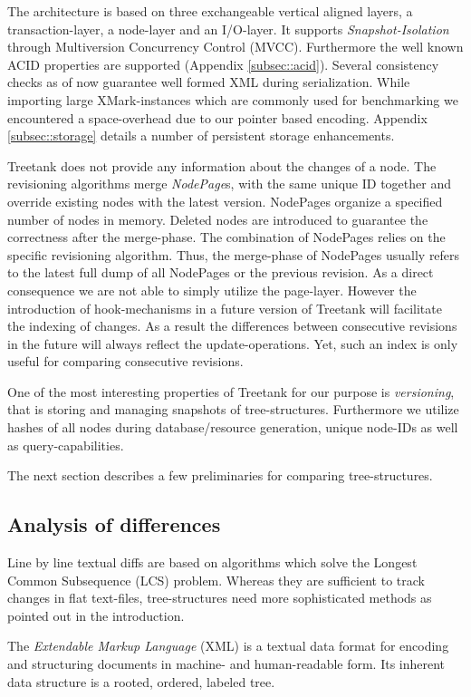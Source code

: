 The architecture is based on three exchangeable vertical aligned layers, a transaction-layer, a node-layer and an I/O-layer. It supports \emph{Snapshot-Isolation} through Multiversion Concurrency Control (MVCC). Furthermore the well known ACID properties are supported (Appendix \ref{subsec::acid}). Several consistency checks as of now guarantee well formed XML during serialization. While importing large XMark-instances \cite{XMark} which are commonly used for benchmarking we encountered a space-overhead due to our pointer based encoding. Appendix \ref{subsec::storage} details a number of persistent storage enhancements.

Treetank does not provide any information about the changes of a node. The revisioning algorithms merge \emph{NodePage}s, with the same unique ID together and override existing nodes with the latest version. NodePages organize a specified number of nodes in memory. Deleted nodes are introduced to guarantee the correctness after the merge-phase. The combination of NodePages relies on the specific revisioning algorithm. Thus, the merge-phase of NodePages usually refers to the latest full dump of all NodePages or the previous revision. As a direct consequence we are not able to simply utilize the page-layer. However the introduction of hook-mechanisms in a future version of Treetank will facilitate the indexing of changes. As a result the differences between consecutive revisions in the future will always reflect the update-operations. Yet, such an index is only useful for comparing consecutive revisions.

One of the most interesting properties of Treetank for our purpose is \emph{versioning}, that is storing and managing snapshots of tree-structures. Furthermore we utilize hashes of all nodes during database/resource generation, unique node-IDs as well as query-capabilities.

The next section describes a few preliminaries for comparing tree-structures.

\subsection{Analysis of differences}
Line by line textual diffs are based on algorithms which solve the Longest Common Subsequence (LCS) problem. Whereas they are sufficient to track changes in flat text-files, tree-structures need more sophisticated methods as pointed out in the introduction.

The \emph{Extendable Markup Language} (XML) is a textual data format for encoding and structuring documents in machine- and human-readable form. Its inherent data structure is a rooted, ordered, labeled tree. 

